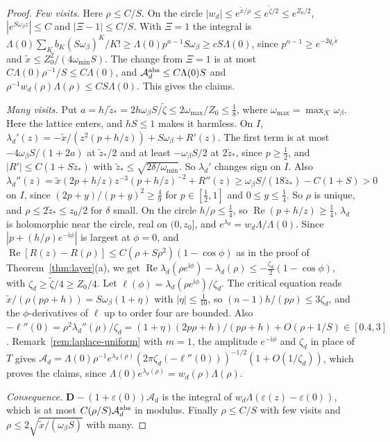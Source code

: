 \begin{proof}
\emph{Few visits.} Here $\rho\le C/S$. On the circle $|w_d|\le e^{\tilde x/\rho}\le e^{\tilde\zeta/2}\le e^{Z_0/2}$,
$|e^{S\omega_\beta z}|\le C$ and $|\Xi-1|\le C/S$. With $\Xi=1$ the integral is
$\Lambda(0)\sum_Kb_K(S\omega_\beta)^K/K!\ge\Lambda(0)p^{n-1}S\omega_\beta\ge cS\Lambda(0)$, since
$p^{n-1}\ge e^{-2q_i\tilde x}$ and $\tilde x\le Z_0^2/(4\omega_{\min}S)$. The change from $\Xi=1$ is at
most $C\Lambda(0)\rho^{-1}/S\le C\Lambda(0)$, and $\mathcal A_d^{\rm abs}\le C\Lambda(0)S$ and
$\rho^{-1}w_d(\rho)\Lambda(\rho)\le CS\Lambda(0)$. This gives the claims.

\emph{Many visits.} Put $a=h/\tilde z_*=2h\omega_\beta S/\tilde\zeta\le2\omega_{\max}/Z_0\le\frac18$, where
$\omega_{\max}=\max_{\mathcal K}\omega_\beta$.
Here the lattice enters, and $hS\le1$ makes it harmless. On $I$,
$\lambda_d'(z)=-\tilde x/(z^2(p+h/z))+S\omega_\beta+R'(z)$. The first term is at most
$-4\omega_\beta S/(1+2a)$ at $\tilde z_*/2$ and at least $-\omega_\beta S/2$ at $2\tilde z_*$,
since $p\ge\frac12$, and $|R'|\le C(1+S\tilde z_*)$ with $\tilde z_*\le\sqrt{2\delta/\omega_{\min}}$.
So $\lambda_d'$ changes sign on $I$. Also
$\lambda_d''(z)=\tilde x(2p+h/z)z^{-3}(p+h/z)^{-2}+R''(z)\ge\omega_\beta S/(18\tilde z_*)-C(1+S)>0$
on $I$, since $(2p+y)/(p+y)^2\ge\frac49$ for $p\in[\frac12,1]$ and $0\le y\le\frac14$. So $\rho$ is
unique, and $\rho\le2\tilde z_*\le z_0/2$ for $\delta$ small. On the circle $h/\rho\le\frac14$, so
$\operatorname{Re}(p+h/z)\ge\frac14$, $\lambda_d$ is holomorphic near the circle, real on
$(0,z_0]$, and $e^{\lambda_d}=w_d\Lambda/\Lambda(0)$. Since
$|p+(h/\rho)e^{-\mathrm i\phi}|$ is largest at $\phi=0$, and
$\operatorname{Re}[R(z)-R(\rho)]\le C(\rho+S\rho^2)(1-\cos\phi)$ as in the proof of
Theorem~\ref{thm:layer}(a), we get
$\operatorname{Re}\lambda_d(\rho e^{\mathrm i\phi})-\lambda_d(\rho)\le-\frac{\zeta_d}2(1-\cos\phi)$,
with $\zeta_d\ge\tilde\zeta/4\ge Z_0/4$. Let $\ell(\phi)=\lambda_d(\rho e^{\mathrm i\phi})/\zeta_d$. The
critical equation reads $\tilde x/(\rho(p\rho+h))=S\omega_\beta(1+\eta)$ with $|\eta|\le\frac1{10}$,
so $(n-1)h/(p\rho)\le3\zeta_d$, and the $\phi$-derivatives of $\ell$ up to order four are bounded.
Also $-\ell''(0)=\rho^2\lambda_d''(\rho)/\zeta_d=(1+\eta)(2p\rho+h)/(p\rho+h)+O(\rho+1/S)\in[0.4,3]$.
Remark~\ref{rem:laplace-uniform} with $m=1$, the amplitude $e^{-\mathrm i\phi}$ and $\zeta_d$ in place of
$T$ gives
$\mathcal A_d=\Lambda(0)\rho^{-1}e^{\lambda_d(\rho)}(2\pi\zeta_d(-\ell''(0)))^{-1/2}(1+O(1/\zeta_d))$,
which proves the claims, since $\Lambda(0)e^{\lambda_d(\rho)}=w_d(\rho)\Lambda(\rho)$.

\emph{Consequence.} $\mathbf D-(1+\varepsilon(0))\mathcal A_d$ is the integral of
$w_d\Lambda(\varepsilon(z)-\varepsilon(0))$, which is at most $C(\rho/S)\mathcal A_d^{\rm abs}$ in
modulus. Finally $\rho\le C/S$ with few visits and $\rho\le2\sqrt{\tilde x/(\omega_\beta S)}$ with
many.
\end{proof}

